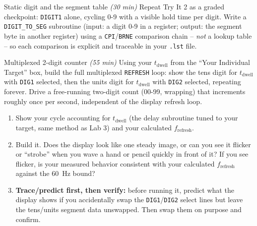 \documentclass[11pt]{article}
\begin{document}
\begin{labexercise}{Static digit and the segment table \hfill {\small \itshape (30 min)}}
Repeat Try It 2 as a graded checkpoint: \texttt{DIGIT1} alone, cycling 0-9 with a
visible hold time per digit. Write a \texttt{DIGIT\_TO\_SEG} subroutine (input: a
digit 0-9 in a register; output: the segment byte in another register) using a
\texttt{CPI}/\texttt{BRNE} comparison chain -- \emph{not} a lookup table -- so each
comparison is explicit and traceable in your \texttt{.lst} file.
\end{labexercise}

\begin{labexercise}{Multiplexed 2-digit counter \hfill {\small \itshape (55 min)}}
Using your $t_{\text{dwell}}$ from the ``Your Individual Target'' box, build the
full multiplexed \texttt{REFRESH} loop: show the tens digit for $t_{\text{dwell}}$
with \texttt{DIG1} selected, then the units digit for $t_{\text{dwell}}$ with
\texttt{DIG2} selected, repeating forever. Drive a free-running two-digit count
(00-99, wrapping) that increments roughly once per second, independent of the
display refresh loop.
\begin{enumerate}[nosep,leftmargin=*]
  \item Show your cycle accounting for $t_{\text{dwell}}$ (the delay subroutine
        tuned to your target, same method as Lab 3) and your calculated
        $f_{\text{refresh}}$.
  \item Build it. Does the display look like one steady image, or can you see it
        flicker or ``strobe'' when you wave a hand or pencil quickly in front of it?
        If you see flicker, is your measured behavior consistent with your
        calculated $f_{\text{refresh}}$ against the 60~Hz bound?
  \item \textbf{Trace/predict first, then verify:} before running it, predict what
        the display shows if you accidentally swap the \texttt{DIG1}/\texttt{DIG2}
        select lines but leave the tens/units segment data unswapped. Then swap them
        on purpose and confirm.
\end{enumerate}
\end{labexercise}
\end{document}

